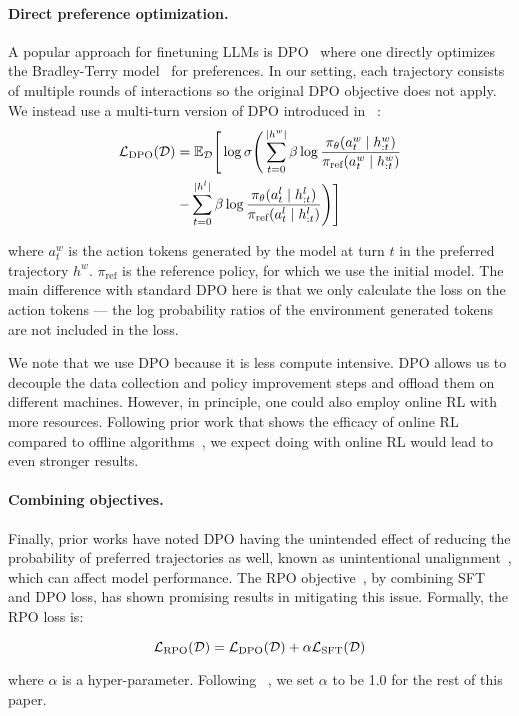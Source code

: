 \paragraph{Direct preference optimization.} A popular approach for finetuning LLMs is DPO~\citep{rafailov2024direct} where one directly optimizes the Bradley-Terry model~\citep{bradley1952rank} for preferences. In our setting, each trajectory consists of multiple rounds of interactions so the original DPO objective does not apply. We instead use a multi-turn version of DPO introduced in ~\citet{rafailov2024rqlanguagemodel}:
\begin{multline}
    \mathcal{L}_\text{DPO}({\mathcal{D}}) = \mathbb{E}_{{\mathcal{D}}}\Bigg[\log \sigma\Bigg( 
    \sum_{t=0}^{|h^w|}\beta \log\frac{\pi_\theta(a_t^w \mid h_{:t}^w)}{\pi_\text{ref}(a_t^w \mid h_{:t}^w)} \\
    - \sum_{t=0}^{|h^l|}\beta \log\frac{\pi_\theta(a_t^l \mid h_{:t}^l)}{\pi_\text{ref}(a_t^l \mid h_{:t}^l)}
    \Bigg)\Bigg]
\end{multline}

where $a_t^w$ is the action tokens generated by the model at turn $t$ in the preferred trajectory $h^w$.
$\pi_\text{ref}$ is the reference policy, for which we use the initial model.
The main difference with standard DPO here is that we only calculate the loss on the action tokens --- the log probability ratios of the environment generated tokens are not included in the loss.

We note that we use DPO because it is less compute intensive. DPO allows us to decouple the data collection and policy improvement steps and offload them on different machines. However, in principle, one could also employ online RL with more resources. Following prior work that shows the efficacy of online RL compared to offline algorithms~\citep{xu2024dposuperiorppollm,tajwar2024preferencefinetuningllmsleverage}, we expect doing \ours{} with online RL would lead to even stronger results.

\paragraph{Combining objectives.} 

Finally, prior works have noted DPO having the unintended effect of reducing the probability of preferred trajectories as well, known as unintentional unalignment~\citep{razin2024unintentionalunalignmentlikelihooddisplacement}, which can affect model performance. The RPO objective~\citep{pang2024iterativereasoningpreferenceoptimization}, by combining SFT and DPO loss, has shown promising results in mitigating this issue. Formally, the RPO loss is:

\begin{equation} \label{eq:rpo_formula}
    \mathcal{L}_{\text{RPO}}(\mathcal{D}) = \mathcal{L}_\text{DPO}({\mathcal{D}}) + \alpha \mathcal{L}_\text{SFT}({\mathcal{D}})
\end{equation}

where $\alpha$ is a hyper-parameter. Following ~\citet{pang2024iterativereasoningpreferenceoptimization}, we set $\alpha$ to be 1.0 for the rest of this paper.

